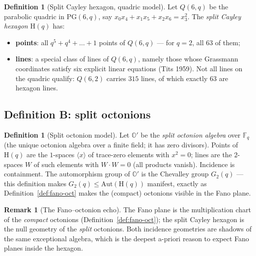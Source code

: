 \documentclass[11pt]{article}
\theoremstyle{definition}
\newtheorem{definition}[theorem]{Definition}
\newtheorem{remark}[theorem]{Remark}
\newcommand{\F}{\mathbb{F}}
\newcommand{\PG}{\mathrm{PG}}
\newcommand{\Aut}{\mathrm{Aut}}
\begin{document}
\begin{definition}[Split Cayley hexagon, quadric model]\label{def:hex-quadric}
Let $Q(6,q)$ be the parabolic quadric in $\PG(6,q)$, say
$x_0 x_4 + x_1 x_5 + x_2 x_6 = x_3^2$. The \emph{split Cayley hexagon}
$\mathrm H(q)$ has:
\begin{itemize}
\item \textbf{points}: all $q^5+q^4+\dots+1$ points of $Q(6,q)$ ---
for $q=2$, all $63$ of them;
\item \textbf{lines}: a special class of lines of $Q(6,q)$, namely those
whose Grassmann coordinates satisfy six explicit linear equations
(Tits 1959). Not all lines on the quadric qualify: $Q(6,2)$ carries $315$
lines, of which exactly $63$ are hexagon lines.
\end{itemize}
\end{definition}

\subsection{Definition B: split octonions}

\begin{definition}[Split octonion model]\label{def:hex-octonion}
Let $\mathbb O'$ be the \emph{split octonion algebra} over $\F_q$ (the
unique octonion algebra over a finite field; it has zero divisors).
Points of $\mathrm H(q)$ are the $1$-spaces $\langle x\rangle$ of trace-zero
elements with $x^2 = 0$; lines are the $2$-spaces $W$ of such elements with
$W \cdot W = 0$ (all products vanish). Incidence is containment. The
automorphism group of $\mathbb O'$ is the Chevalley group $G_2(q)$ ---
this definition makes $G_2(q) \le \Aut(\mathrm H(q))$ manifest, exactly as
Definition~\ref{def:fano-oct} makes the (compact) octonions visible in the
Fano plane.
\end{definition}

\begin{remark}[The Fano--octonion echo]
The Fano plane is the multiplication chart of the \emph{compact} octonions
(Definition~\ref{def:fano-oct}); the split Cayley hexagon is the null
geometry of the \emph{split} octonions. Both incidence geometries are shadows
of the same exceptional algebra, which is the deepest a-priori reason to
expect Fano planes inside the hexagon.
\end{remark}
\end{document}
